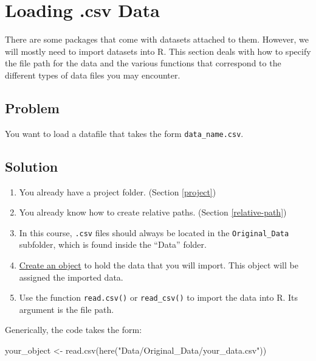 \documentclass[
]{book}
\newenvironment{Shaded}{\begin{snugshade}}{\end{snugshade}}
\newcommand{\FunctionTok}[1]{\textcolor[rgb]{0.00,0.00,0.00}{#1}}
\newcommand{\NormalTok}[1]{#1}
\newcommand{\OtherTok}[1]{\textcolor[rgb]{0.56,0.35,0.01}{#1}}
\newcommand{\StringTok}[1]{\textcolor[rgb]{0.31,0.60,0.02}{#1}}
\providecommand{\tightlist}{%
  \setlength{\itemsep}{0pt}\setlength{\parskip}{0pt}}
\begin{document}
\hypertarget{csv-load}{%
\section{Loading .csv Data}\label{csv-load}}

There are some packages that come with datasets attached to them. However, we will mostly need to import datasets into R. This section deals with how to specify the file path for the data and the various functions that correspond to the different types of data files you may encounter.

\hypertarget{problem-9}{%
\subsection{Problem}\label{problem-9}}

You want to load a datafile that takes the form \texttt{data\_name.csv}.

\hypertarget{solution-9}{%
\subsection{Solution}\label{solution-9}}

\begin{enumerate}
\def\labelenumi{\arabic{enumi}.}
\tightlist
\item
  You already have a project folder. (Section \ref{project})
\item
  You already know how to create relative paths. (Section \ref{relative-path})
\item
  In this course, \texttt{.csv} files should always be located in the \texttt{Original\_Data} subfolder, which is found inside the ``Data'' folder.
\item
  \protect\hyperlink{object}{Create an object} to hold the data that you will import. This object will be assigned the imported data.
\item
  Use the function \texttt{read.csv()} or \texttt{read\_csv()} to import the data into R. Its argument is the file path.
\end{enumerate}

Generically, the code takes the form:

\begin{Shaded}
\begin{Highlighting}[]
\NormalTok{your\_object }\OtherTok{\textless{}{-}} \FunctionTok{read.csv}\NormalTok{(}\FunctionTok{here}\NormalTok{(}\StringTok{"Data/Original\_Data/your\_data.csv"}\NormalTok{))}
\end{Highlighting}
\end{Shaded}
\end{document}
